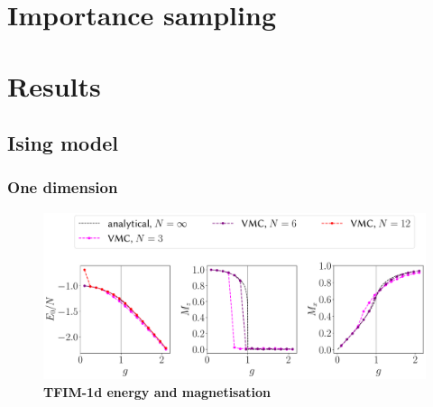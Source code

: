 %
%
%
%

\section{Importance sampling}
\section{Results}
\subsection{Ising model}
\subsubsection{One dimension}
\begin{figure}[H]
	\centering
	\includegraphics[width=\linewidth]{Chapter5/Figs/Vector/tfim1d_finite_scaling.pdf}
	\caption[TFIM-1d energy and magnetisations]{\textbf{TFIM-1d energy and magnetisation}}
	\label{fig:tfim1d_finite_scaling_properties}
\end{figure}

